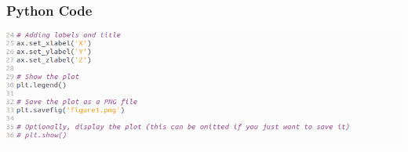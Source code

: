 \documentclass{beamer}
\theoremstyle{remark}
\numberwithin{equation}{section}
\begin{document}
\begin{frame}
\frametitle{Python Code}
    \begin{center}
\includegraphics[width=1\textwidth]{figs/figure5.png}
\end{center}
\end{frame}
\end{document}
